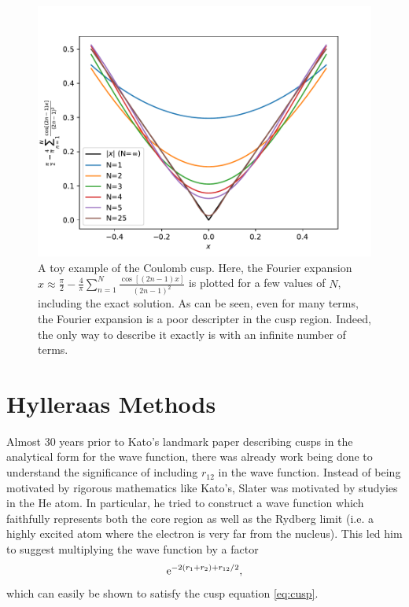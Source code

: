 
\begin{figure}[htbp]
    \centering
    \includegraphics{figures/explicit/cusp.pdf}
    \caption{A toy example of the Coulomb cusp. Here, the Fourier expansion $x\approx\frac{\pi}{2} - \frac {4}{\pi} \sum_{n=1}^N\frac{\cos[(2n-1)x]}{(2n-1)^2}$ is plotted for a few values of $N$, including the exact solution. As can be seen, even for many terms, the Fourier expansion is a poor descripter in the cusp region. Indeed, the only way to describe it exactly is with an infinite number of terms.}
    \label{fig:cusp}
\end{figure}

\section{Hylleraas Methods}

Almost 30 years prior to Kato's landmark paper describing cusps in the analytical form for the wave function, there was already work being done to understand the significance of including $r_{12}$ in the wave function. Instead of being motivated by rigorous mathematics like Kato's, Slater was motivated by studyies in the He atom. In particular, he tried to construct a wave function which faithfully represents both the core region as well as the Rydberg limit (i.e. a highly excited atom where the electron is very far from the nucleus).\cite{kongExplicitly2012,grynbergIntroduction2010,slaterCentralFieldsRydberg1928,slaterNormal1928} This led him to suggest multiplying the wave function by a factor
\begin{equation}
    \mathrm{e}^{-2(r_1+r_2)+r_{12}/2},
\end{equation}
which can easily be shown to satisfy the cusp equation \eqref{eq:cusp}.

